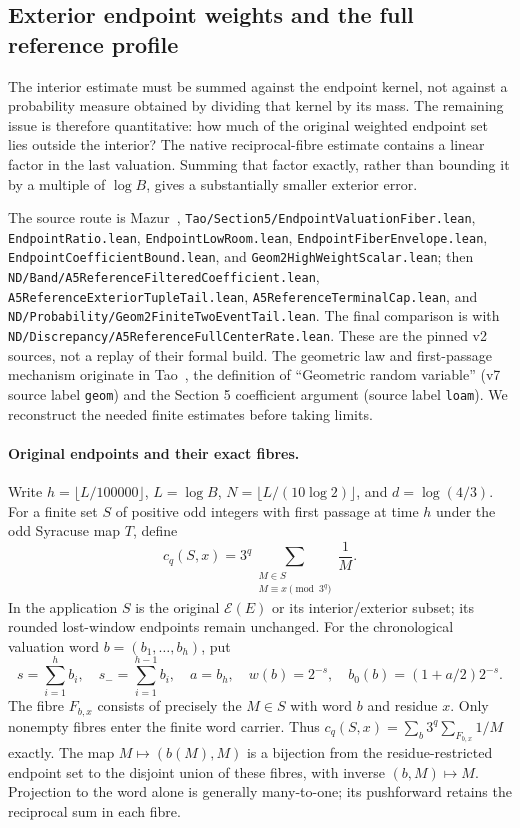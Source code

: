 \subsection{Exterior endpoint weights and the full reference profile}
\label{sec:Mazur-exterior-assembly}

The interior estimate must be summed against the endpoint kernel, not
against a probability measure obtained by dividing that kernel by its
mass. The remaining issue is therefore quantitative: how much of the
original weighted endpoint set lies outside the interior? The native
reciprocal-fibre estimate contains a linear factor in the last valuation.
Summing that factor exactly, rather than bounding it by a multiple of
$\log B$, gives a substantially smaller exterior error.

The source route is Mazur~\cite{Mazur2026v2},
\texttt{Tao/Section5/EndpointValuationFiber.lean},
\texttt{EndpointRatio.lean}, \texttt{EndpointLowRoom.lean},
\texttt{EndpointFiberEnvelope.lean}, \texttt{EndpointCoefficientBound.lean},
and \texttt{Geom2HighWeightScalar.lean};
then \texttt{ND/Band/A5ReferenceFilteredCoefficient.lean},
\texttt{A5ReferenceExteriorTupleTail.lean},
\texttt{A5ReferenceTerminalCap.lean}, and
\texttt{ND/Probability/Geom2FiniteTwoEventTail.lean}.
The final comparison is with
\texttt{ND/Discrepancy/A5ReferenceFullCenterRate.lean}.
These are the pinned v2 sources, not a replay of their formal build.
The geometric law and first-passage mechanism originate in
Tao~\cite{Tao2026v7}, the definition of ``Geometric random variable''
(v7 source label \texttt{geom}) and the Section 5 coefficient argument
(source label \texttt{loam}).
We reconstruct the needed finite estimates before taking limits.

\paragraph{Original endpoints and their exact fibres.}
Write $h=\lfloor L/100000\rfloor$, $L=\log B$,
$N=\lfloor L/(10\log2)\rfloor$, and $d=\log(4/3)$.
For a finite set $S$ of positive odd integers with first passage at time
$h$ under the odd Syracuse map $T$, define
\[
 c_q(S,x)=3^q\sum_{\substack{M\in S\\M\equiv x\pmod{3^q}}}\frac1M .
\]
In the application $S$ is the original $\mathcal E(E)$ or its
interior/exterior subset; its rounded lost-window endpoints remain
unchanged. For the chronological valuation word
$b=(b_1,\ldots,b_h)$, put
\[
 s=\sum_{i=1}^h b_i,\quad s_-=\sum_{i=1}^{h-1}b_i,\quad a=b_h,
 \quad w(b)=2^{-s},\quad b_0(b)=(1+a/2)2^{-s}.
\]
The fibre $F_{b,x}$ consists of precisely the $M\in S$ with word $b$
and residue $x$. Only nonempty fibres enter the finite word carrier.
Thus $c_q(S,x)=\sum_b3^q\sum_{F_{b,x}}1/M$ exactly.
The map $M\mapsto(b(M),M)$ is a bijection from the residue-restricted
endpoint set to the disjoint union of these fibres, with inverse
$(b,M)\mapsto M$. Projection to the word alone is generally many-to-one;
its pushforward retains the reciprocal sum in each fibre.

